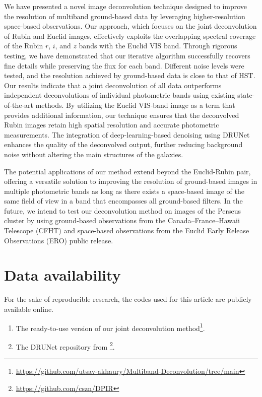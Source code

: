 \documentclass[traditabstract]{aa}
\begin{document}
We have presented a novel image deconvolution technique designed to improve the resolution of multiband ground-based data by leveraging higher-resolution space-based observations. Our approach, which focuses on the joint deconvolution of Rubin and Euclid images, effectively exploits the overlapping spectral coverage of the Rubin $r$, $i$, and $z$ bands with the Euclid VIS band. Through rigorous testing, we have demonstrated that our iterative algorithm successfully recovers fine details while preserving the flux for each band. Different noise levels were tested, and the resolution achieved by ground-based data is close to that of HST. Our results indicate that a joint deconvolution of all data outperforms independent deconvolutions of individual photometric bands using existing state-of-the-art methods. By utilizing the Euclid VIS-band image as a term that provides additional information, our technique ensures that the deconvolved Rubin images retain high spatial resolution and accurate photometric measurements. The integration of deep-learning-based denoising using DRUNet enhances the quality of the deconvolved output, further reducing background noise without altering the main structures of the galaxies.

The potential applications of our method extend beyond the Euclid-Rubin pair, offering a versatile solution to improving the resolution of ground-based images in multiple photometric bands as long as there exists a space-based image of the same field of view in a band that encompasses all ground-based filters. In the future, we intend to test our deconvolution method on images of the Perseus cluster by using ground-based observations from the Canada–France–Hawaii Telescope (CFHT) and space-based observations from the Euclid Early Release Observations (ERO) public release.


\section*{Data availability}
\label{sec:reproducible_research}

For the sake of reproducible research, the codes used for this article are publicly available online. 

\begin{enumerate}
    \item The ready-to-use version of our joint deconvolution method\footnote{\url{https://github.com/utsav-akhaury/Multiband-Deconvolution/tree/main}}.
    \item The DRUNet repository from \cite{drunet} \footnote{\url{https://github.com/cszn/DPIR}}.
\end{enumerate}
\end{document}
